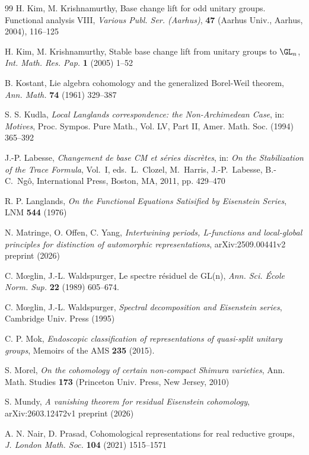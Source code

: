 \begin{thebibliography}{99}
 H. Kim, M. Krishnamurthy, Base change lift for odd unitary groups. Functional analysis VIII, {\it Various Publ. Ser. (Aarhus)}, {\bf 47} (Aarhus Univ., Aarhus, 2004), 116--125

 H. Kim, M. Krishnamurthy, Stable base change lift from unitary groups to $\GL_n$, {\it Int. Math. Res. Pap.} {\bf 1} (2005) 1--52

 B. Kostant, Lie algebra cohomology and the generalized Borel-Weil theorem, {\it Ann. Math.} \textbf{74} (1961) 329--387


 S. S. Kudla, {\it Local Langlands correspondence: the Non-Archimedean Case}, in: {\it Motives}, Proc. Sympos. Pure Math., Vol. LV, Part II, Amer. Math. Soc. (1994) 365--392

   J.-P. Labesse, {\it Changement de base CM et s\'eries discr\`etes}, in: {\it On the Stabilization of the Trace Formula}, Vol.\ I, eds.\ L.\ Clozel, M.\ Harris, J.-P.\ Labesse, B.-C.\ Ng\^ o, International Press, Boston, MA, 2011, pp. 429--470


 R. P. Langlands, {\it On the Functional Equations Satisified by Eisenstein Series},  LNM {\bf 544} (1976)


 N. Matringe, O. Offen, C. Yang, {\it Intertwining periods, L-functions and local-global principles for distinction of automorphic representations}, arXiv:2509.00441v2 preprint (2026)


  C. M\oe glin, J.-L. Waldspurger, Le spectre r\'esiduel de GL(n),  {\it Ann. Sci. \'Ecole Norm. Sup.} {\bf 22} (1989) 605--674.

 C. M\oe glin, J.-L. Waldspurger, {\it Spectral decomposition and Eisenstein series}, Cambridge Univ. Press (1995)

  C. P. Mok, {\it Endoscopic classification of representations of quasi-split unitary groups}, Memoirs of the AMS {\bf 235} (2015).

 S. Morel, {\it On the cohomology of certain non-compact Shimura varieties}, Ann. Math. Studies {\bf 173} (Princeton Univ. Press, New Jersey, 2010)

 S. Mundy, {\it A vanishing theorem for residual Eisenstein cohomology}, arXiv:2603.12472v1 preprint (2026)

 A. N. Nair, D. Prasad, Cohomological representations for real reductive groups, {\it J. London Math. Soc.} {\bf 104} (2021) 1515--1571


\end{thebibliography}
